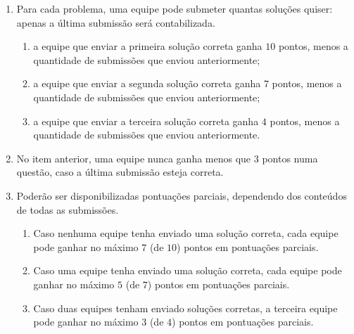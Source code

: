 \documentclass[10pt,a4paper]{article}
\begin{document}
\begin{enumerate}[label* = \textbf{\Roman*.}]
		\item Para cada problema, uma equipe pode submeter quantas soluções quiser: apenas a última submissão será contabilizada.
			\begin{enumerate}[label*=\textbf{\arabic*.}]
				\item a equipe que enviar a primeira solução correta ganha $10$ pontos, menos a quantidade de submissões que enviou anteriormente;
				\item a equipe que enviar a segunda solução correta ganha $7$ pontos, menos a quantidade de submissões que enviou anteriormente;
				\item a equipe que enviar a terceira solução correta ganha $4$ pontos, menos a quantidade de submissões que enviou anteriormente.
			\end{enumerate}
		\item No item anterior, uma equipe nunca ganha menos que $3$ pontos numa questão, caso a última submissão esteja correta.
		\item Poderão ser disponibilizadas pontuações parciais, dependendo dos conteúdos de todas as submissões.
			\begin{enumerate}[label* = \textbf{\arabic*.}]
				\item Caso nenhuma equipe tenha enviado uma solução correta, cada equipe pode ganhar no máximo $7$ (de $10$) pontos em pontuações parciais.
				\item Caso uma equipe tenha enviado uma solução correta, cada equipe pode ganhar no máximo $5$ (de $7$) pontos em pontuações parciais.
				\item Caso duas equipes tenham enviado soluções corretas, a terceira equipe pode ganhar no máximo $3$ (de $4$) pontos em pontuações parciais.
			\end{enumerate}
	\end{enumerate}

	\vfill

	\newpage
	\zeustitle

\end{document}
